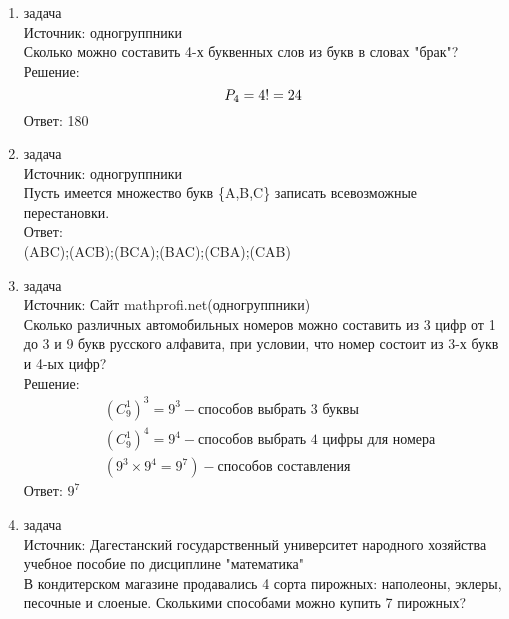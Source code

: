 \documentclass[a4paper,14pt]{extreport} %
\begin{document}
\begin{center}
\begin{enumerate}
						 
						  \item {\large задача  }\\
						 Источник: одногруппники\\
						 \vspace{15pt}
						 Сколько можно составить 4-х буквенных слов из букв в словах "брак"?
						 \\
						 \vspace{15pt}
						 Решение:\\
						 \begin{equation}
						 	P_4 = 4! = 24 \space 
						 \end{equation}
						  Ответ: 180
						  
						  \item {\large задача  }\\
						 Источник: одногруппники\\
						 \vspace{15pt}
						 Пусть имеется множество букв \{A,B,C\} записать всевозможные перестановки.
						 \\
						 \vspace{15pt}
						 Ответ:\\
						 (ABC);(ACB);(BCA);(BAC);(CBA);(CAB)
						 \newpage
						 
						  \item {\large задача  }\\
						 Источник: Сайт mathprofi.net(одногруппники)\\
						 \vspace{15pt}
						 Сколько различных автомобильных номеров можно составить из 3 цифр от 1 до 3 и 9 букв русского алфавита, при условии, что номер состоит из 3-х букв и 4-ых цифр?
						 \\
						 \vspace{15pt}
						 Решение:
						 \begin{align}
						 	& (C_9^1)^3=9^3 - \text{способов выбрать 3 буквы}\\
						 	& (C_9^1)^4=9^4 - \text{способов выбрать 4 цифры для номера}\\
						 	& (9^3 \times 9^4 = 9^7) - \text{способов составления}
						 \end{align}
						 Ответ: $9^7$
						 
						  \item {\large задача }\\
						 Источник: Дагестанский государственный университет народного хозяйства учебное пособие по дисциплине "математика"  \\
						 \vspace{15pt}
						 В кондитерском магазине продавались 4 сорта пирожных:
						 наполеоны, эклеры, песочные и слоеные. Сколькими способами можно
						 купить 7 пирожных?\\
						 \vspace{15pt}
						 

\end{enumerate}
\end{center}
\end{document}
